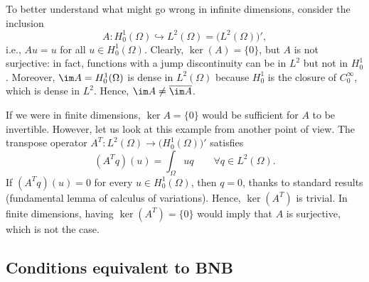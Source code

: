 \begin{example}
	To better understand what might go wrong in infinite dimensions, consider the inclusion
	\[
	A: H_0^1(\Omega) \hookrightarrow L^2(\Omega) = \bigl(L^2(\Omega)\bigr)',
	\]
	i.e., $Au = u$ for all $u\in H_0^1(\Omega)$. Clearly, $\ker(A)=\{0\}$, but $A$ is not surjective: in fact, functions with a jump discontinuity can be in $L^2$ but not in $H^1_0$. Moreover, $\im A = H_0^1(\Omega)$ is dense in $L^2(\Omega)$ because $H_0^1$ is the closure of $C_0^\infty$, which is dense in $L^2$. Hence, $\im A\neq\overline{\im A}$.
	
	If we were in finite dimensions, $\ker A = \{0\}$ would be sufficient for $A$ to be invertible. However, let us look at this example from another point of view. The transpose operator $A^T: L^2(\Omega) \to \bigl(H_0^1(\Omega)\bigr)'$ satisfies
	\[
	(A^T q)(u) = \int_{\Omega} uq \qquad \forall q \in L^2(\Omega).
	\]
	If $(A^T q)(u) = 0$ for every $u \in H_0^1(\Omega)$, then $q = 0$, thanks to standard results (fundamental lemma of calculus of variations). Hence, $\ker (A^T)$ is trivial. In finite dimensions, having $\ker (A^T) = \{0\}$ would imply that $A$ is surjective, which is not the case.
\end{example}


\subsection{Conditions equivalent to BNB}


